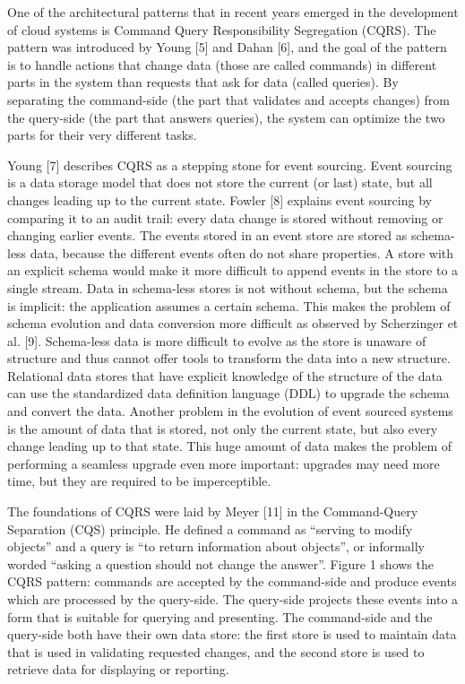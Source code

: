 

One of the architectural patterns that in recent years emerged in the development of cloud systems is Command Query Responsibility Segregation (CQRS). The pattern was introduced by Young [5] and Dahan [6], and the goal of the pattern is to handle actions that change data (those are called commands) in different parts in the system than requests that ask for data (called queries). By separating the command-side (the part that validates and accepts changes) from the query-side (the part that answers queries), the system can optimize the two parts for their very different tasks.

Young [7] describes CQRS as a stepping stone for event sourcing. Event sourcing is a data storage model that does not store the current (or last) state, but all changes leading up to the current state. Fowler [8] explains event sourcing by comparing it to an audit trail: every data change is stored without removing or changing earlier events. The events stored in an event store are stored as schema-less data, because the different events often do not share properties. A store with an explicit schema would make it more difficult to append events in the store to a single stream. Data in schema-less stores is not without schema, but the schema is implicit: the application assumes a certain schema. This makes the problem of schema evolution and data conversion more difficult as observed by Scherzinger et al. [9]. Schema-less data is more difficult to evolve as the store is unaware of structure and thus cannot offer tools to transform the data into a new structure. Relational data stores that have explicit knowledge of the structure of the data can use the standardized data definition language (DDL) to upgrade the schema and convert the data. Another problem in the evolution of event sourced systems is the amount of data that is stored, not only the current state, but also every change leading up to that state. This huge amount of data makes the problem of performing a seamless upgrade even more important: upgrades may need more time, but they are required to be imperceptible.

The foundations of CQRS were laid by Meyer [11] in the Command-Query Separation (CQS) principle. He defined a command as “serving to modify objects” and a query is “to return information about objects”, or informally worded “asking a question should not change the answer”. Figure 1 shows the CQRS pattern: commands are accepted by the command-side and produce events which are processed by the query-side. The query-side projects these events into a form that is suitable for querying and presenting. The command-side and the query-side both have their own data store: the first store is used to maintain data that is used in validating requested changes, and the second store is used to retrieve data for displaying or reporting.

